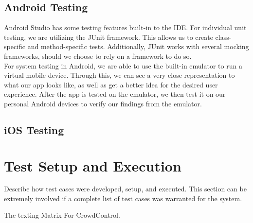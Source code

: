 \subsection{Android Testing}
Android Studio has some testing features built-in to the IDE. For individual unit testing, we are utilizing the JUnit framework. This allows us to create class-specific and method-specific tests. Additionally, JUnit works with several mocking frameworks, should we choose to rely on a framework to do so.\\

For system testing in Android, we are able to use the built-in emulator to run a virtual mobile device. Through this, we can see a very close representation to what our app looks like, as well as get a better idea for the desired user experience. After the app is tested on the emulator, we then test it on our personal Android devices to verify our findings from the emulator.

\subsection{iOS Testing}

\section{Test Setup and Execution}
Describe how test cases were developed, setup, and executed.  This section can 
be extremely involved if a complete list of test cases was warranted for the system. 


\begin{table}[tbh]
\caption{The texting Matrix For CrowdControl. \label{testingmatrix}}

\end{table}

